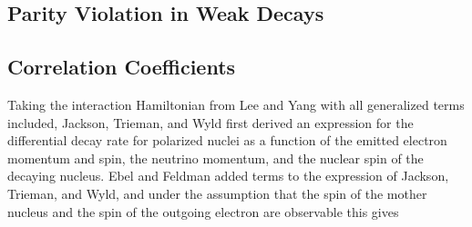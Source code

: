 \subsection{Parity Violation in Weak Decays}

\subsection{Correlation Coefficients}
Taking the interaction Hamiltonian from Lee and Yang with all generalized terms included,
Jackson, Trieman, and Wyld \cite{jackson1957a,jackson1957b} first derived an expression
for the differential decay rate for polarized nuclei as a function of the emitted electron momentum
and spin, the neutrino momentum, and the nuclear spin of the decaying nucleus.
Ebel and Feldman \cite{ebel1957} added terms to the expression of Jackson, Trieman, and Wyld,
and under the assumption that the spin of the mother nucleus and the spin of the outgoing electron
are observable this gives
%
